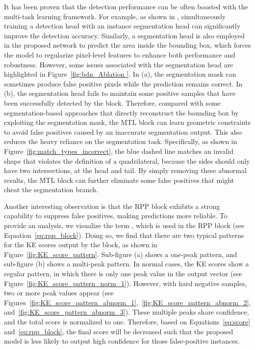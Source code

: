 It has been proven that the detection performance can be often boosted with
the multi-task learning framework. For example, as shown in \cite{he2017mask},  simultaneously training a detection head with an instance segmentation head can significantly improve the detection accuracy. Similarly, a segmentation head is also employed in the proposed \Ours network to predict the area inside the bounding box, which forces the model to regularize pixel-level features to enhance both performance and robustness. However, some issues associated with the segmentation head are highlighted in Figure~\ref{fig:bdn_Ablation }. In (a), the segmentation mask can sometimes produce false positive pixels while the \Ours prediction remains correct. In (b), the segmentation head fails to maintain some positive samples that have been successfully detected by the \Ours block. Therefore, compared with some segmentation-based approaches that directly reconstruct the bounding box by exploiting the segmentation mask, the MTL block can learn geometric constraints to avoid false positives caused by an inaccurate segmentation output. This also reduces the heavy reliance on the segmentation task. Specifically, as shown in Figure~\ref{fig:match_types_incorrect}, the blue dashed line matches an invalid shape that violates the definition of a quadrilateral, because the sides should only have two intersections, at the head and tail. By simply removing these abnormal results, the MTL block can further eliminate some false positives that might cheat the segmentation branch.

Another interesting observation is that the RPP block exhibits a strong capability to suppress false positives, making predictions more reliable. To provide an analysis, we visualize the term , which is used in the RPP block (see Equation~\eqref{eq:rpp_block}). Doing so, we find that there are two typical patterns for the KE scores output by the \Ours block, as shown in Figure~\ref{fig:KE_score_pattern}. Sub-figure (a) shows a one-peak pattern, and sub-figure (b) shows a multi-peak pattern. In normal cases, the KE scores show a regular pattern, in which there is only one peak value in the output vector (see Figure~\ref{fig:KE_score_pattern_norm_1}). However, with hard negative samples, two or more peak values appear (see Figures~\ref{fig:KE_score_pattern_abnorm_1},~\ref{fig:KE_score_pattern_abnorm_2}, and~\ref{fig:KE_score_pattern_abnorm_3}). These multiple peaks share confidence, and the total score is normalized to one. Therefore, based on Equations~\eqref{eq:score} and~\eqref{eq:rpp_block}, the final score will be decreased such that 
the proposed model is less likely to output
high confidence for those false-positive instances.

